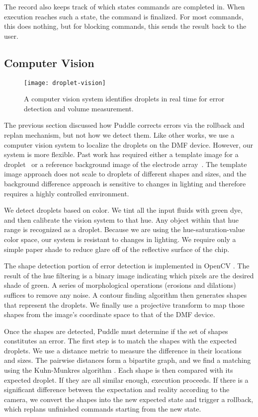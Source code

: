 \documentclass[sigconf, screen]{acmart}
\begin{document}
The record also keeps track of which states commands are completed in.
When execution reaches such a state, the command is finalized.
For most commands, this does nothing, but for blocking commands, this sends the result back to the user.

\subsection{Computer Vision}
\label{sec:vision}

\begin{figure}
  \centering
  \texttt{[image: droplet-vision]}
  \caption{
    A computer vision system identifies droplets in real time for error detection and volume measurement.
  }
  \label{fig:tracking}
\end{figure}

The previous section discussed how Puddle corrects errors via the rollback and replan mechanism, but not how we detect them.
Like other works, we use a computer vision system to localize the droplets on the DMF device.
However, our system is more flexible.
Past work has required either a template image for a droplet~\cite{luo2013error} or a reference background image of the electrode array~\cite{shin2010vision, vo2017image-dmf}.
The template image approach does not scale to droplets of different shapes and sizes, and the background difference approach is sensitive to changes in lighting and therefore requires a highly controlled environment.

We detect droplets based on color.
We tint all the input fluids with green dye, and then calibrate the vision system to that hue.
Any object within that hue range is recognized as a droplet.
Because we are using the hue-saturation-value color space, our system is resistant to changes in lighting.
We require only a simple paper shade to reduce glare off of the reflective surface of the chip.

The shape detection portion of error detection is implemented in OpenCV \cite{opencv}.
The result of the hue filtering is a binary image indicating which pixels are the desired shade of green.
A series of morphological operations (erosions and dilations) suffices to remove any noise.
A contour finding algorithm \cite{findcontours} then generates shapes that represent the droplets.
We finally use a projective transform to map those shapes from the image's coordinate space to that of the DMF device.

Once the shapes are detected, Puddle must determine if the set of shapes constitutes an error.
The first step is to match the shapes with the expected droplets.
We use a distance metric to measure the difference in their locations and sizes.
The pairwise distances form a bipartite graph, and we find a matching using the Kuhn-Munkres algorithm \cite{munkres}.
Each shape is then compared with its expected droplet.
If they are all similar enough, execution proceeds.
If there is a significant difference between the expectation and reality according to the camera, we convert the shapes into the new expected state and trigger a rollback, which replans unfinished commands starting from the new state.
\end{document}
